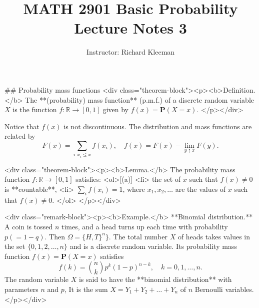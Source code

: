 


\title{MATH 2901 Basic Probability Lecture Notes 3}
\author{Instructor: Richard Kleeman}
\date{}
\maketitle


## Probability mass functions
<div class="theorem-block"><p><b>Definition.</b> 
The **(probability) mass function** (p.m.f.) of a discrete random variable $X$ is the function $f: \mathbb{R} \to[0, 1]$ given by $f(x) = \mathbf{P}(X = x)$. 
</p></div>

Notice that $f(x)$ is not discontinuous. The distribution and mass functions are related by
$$\begin{equation}
    F(x) = \sum_{i: x_i \leq x} f(x_i), \quad f(x) = F(x) - \lim_{y\uparrow x} F(y).
\end{equation}$$

<div class="theorem-block"><p><b>Lemma.</b> 
The probability mass function $f: \mathbb{R} \to [0, 1]$ satisfies: 
<ol>[(a)]
    <li> the set of $x$ such that $f(x) \neq 0$ is **countable**,
    <li> $\sum_{i} f(x_i) = 1$, where $x_1, x_2, \dots$ are the values of $x$ such that $f(x)\neq 0$.
</ol>
</p></div>

<div class="remark-block"><p><b>Example.</b> 
**Binomial distribution.** A coin is tossed $n$ times, and a head turns up each time with probability $p (= 1 - q)$. Then $\Omega = \{H, T\}^n \}$. The total number $X$ of heads takes values in the set $\{0, 1, 2, \dots , n\}$ and is a discrete random variable. Its probability mass function $f(x) = \mathbf{P}(X = x)$ satisfies 
$$\begin{equation}
    f(k)= \binom{n}{k} p^{k}(1-p)^{n-k}, \quad k=0,1, \ldots, n.
\end{equation}$$
The random variable $X$ is said to have the **binomial distribution** with parameters $n$ and $p$, It is the sum $X = Y_1 + Y_2 + \dots + Y_n$ of $n$ Bernoulli variables.
</p></div>


